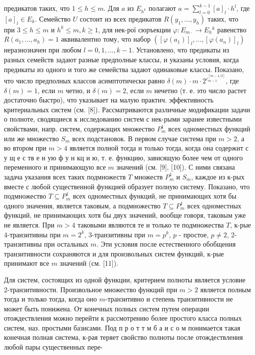 \documentclass[10pt]{article}
\begin{document}
предикатов таких, что $1 \leqslant h \leqslant m$. Для $a$ из $E_{h^{k}}$ полагают $a=\sum_{l=0}^{k-1}[a]_{l} \cdot h^{l}$, где $[a]_{l} \in E_{k}$. Семейство $U$ состоит из всех предикатов $R\left(y_{1}, \ldots, y_{h}\right)$ таких, что при $3 \leqslant h \leqslant m$ и $h^{k} \leqslant m, k \geqslant 1$, для нек-рої сюръекции $\varphi: E_{m \cdot} \rightarrow E_{h}{ }^{k}$ равенство $R\left(a_{1}, \ldots, a_{h}\right)=1$ әквивалентно тому, что набор $\left(\left[\varphi\left(a_{1}\right)\right]_{l}, \ldots,\left[\varphi\left(a_{n}\right)\right]_{l}\right)$ неразнозначен при любом $l=0,1, \ldots, k-1$. Установлено, что предикаты из разных семейств задают разные предполные классы, и указаны условия, когда предикаты из одного и того же семейства задают одинаковые классы. Показано, что число предполных классов асимптотически равно $\delta(m) \cdot m \cdot 2^{c_{m-1}^{[m-1 / 2]}}$, где $\delta(m)=1$, если $m$ четно, и $\delta(m)=2$, если $m$ нечетно (т. е. это число растет достаточно быстро), что указывает на малую практич. эффективность критериальных систем (см. [8]). Рассматриваются различные модификации задачи о полноте, сводящиеся к исследованию систем с нек-рыми заранее известными свойствами, напр. систем, содержащих множество $P_{m}^{1}$ всех одноместных функций или же множество $S_{m}$ всех подстановок. В первом случае система при $m>2$, а во втором при $m>4$ является полной тогда и только тогда, когда она содержит с у щ е с тв е н ую ф у н кц и ю, т. е. функцию, зависящую более чем от одного переменного и принимающую все $m$ значений (см. [9], [10]). С ними связана задача указания всех таких подмножеств $T$ множеств $P_{m}^{1}$ и $S_{m}$, каждое из к-рых вместе с любой существенной функцией образует полную систему. Показано, что подмножество $T \subseteq P_{m}^{1}$ всех одноместных функций, не принимающих хотя бы одного значения, является таковым, а подмножество $T \subseteq P_{m}^{1}$ всех одноместных функций, не принимающих хотя бы двух значений, вообще говоря, таковым уже не является. При $m>4$ таковыми являются те и только те подмножества $T$, к-рые 4-транзитивны при $m=2^{k}$, 3-транзитивны при $m=p^{k}$, $p$ - простое, $p \neq 2$, 2-транзитивны при остальных $m$. Эти условия после естественного обобщения транзитивности сохраняются и для произвольных систем функций, к-рые принимают все $m$ значений (см. [11]).



Для систем, состоящих из одной функции, критерием полноты является условие 2-транзитивности. Произвольное множество функций при $m>2$ является полным тогда и только тогда, когда оно $m$-транзитивно и степень транзитивности не может быть понижена. От конечных полных систем путем операции отождествления можно перейти к рассмотрению более простого класса полных систем, наз. простыми базисами. Под п р о т т м б а и с о м понимается такая конечная полная система, к-рая теряет свойство полноты после отождествления любой пары существенных пере-
\end{document}
